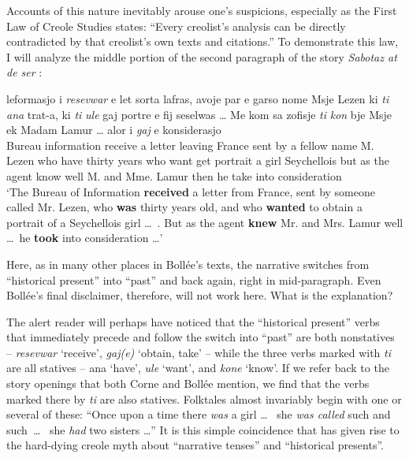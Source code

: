 Accounts of this nature inevitably arouse one's suspicions, especially as the First Law of Creole Studies states: ``Every creolist's analysis can be directly contradicted by that creolist's own texts and citations.'' To demonstrate this law, I will analyze the middle portion of the second paragraph of the story \textit{Sabotaz at de ser} \citep[166]{Bollee1977}:

\ea\label{ex:2:94}
 {leformasjo} {i} \emph{resevwar} {e} {let} {sorta} {lafras,} {avoje} {par} {e} {garso} {nome} {M}{sje} {Lezen} {ki} \emph{ti} \emph{ana} {trat-a,} {ki} \emph{ti} \emph{ule} {gaj} {portre} {e} {fij} {seselwas} {\ldots } {Me} {kom} {sa} {zofisje} \emph{ti} \emph{kon} {b}{je} {Msje} {ek} {M}{adam} {Lamur} {\ldots} {alor} i \emph{gaj} {e} {konsiderasjo} \\
Bureau information {\PM} receive a letter leaving France sent by a fellow name M. Lezen who {\TNS} have {thirty years} who {\TNS} want get portrait a girl Seychellois { } but as the agent {\TNS} know well M. and Mme. Lamur { } then he take into consideration\\
\glt `The Bureau of Information \textbf{received} a letter from France, sent by someone called Mr. Lezen, who \textbf{was} thirty years old, and who \textbf{wanted} to obtain a portrait of a Seychellois girl \ldots~. But as the agent \textbf{knew} Mr. and Mrs. Lamur well \ldots~he \textbf{took} into consideration \ldots '
\z

Here, as in many other places in Bollée's texts, the narrative switches from ``historical present'' into ``past'' and back again, right in mid-paragraph. Even Bollée's final disclaimer, therefore, will not work here. What is the explanation?

The alert reader will perhaps have noticed that the ``historical present'' verbs that immediately precede and follow the switch into ``past'' are both nonstatives -- \textit{resevwar} `receive', \textit{gaj(e)} `obtain, take' -- while the three verbs marked with \textit{ti} are all statives -- ana `have', \textit{ule} `want', and \textit{kone} `know'. If we refer back to the story openings that both Corne and Bollée mention, we find that the verbs marked there by \textit{ti} are also statives. Folktales almost invariably begin with one or several of these: ``Once upon a time there \textit{was} a girl \ldots~ she \textit{was called} such and such~\ldots~ she \textit{had} two sisters \ldots '' It is this simple coincidence that has given rise to the hard-dying creole myth about ``narrative tenses'' and ``historical presents''.

